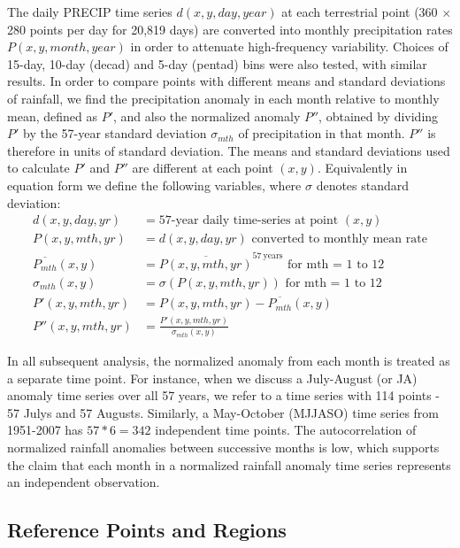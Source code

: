 The daily PRECIP time series $d(x,y,day,year)$ at each terrestrial point (360 $\times$ 280 points per day for 20,819 days) are converted into monthly precipitation rates $P(x,y,month,year)$ in order to attenuate high-frequency variability. Choices of 15-day, 10-day (decad) and 5-day (pentad) bins were also tested, with similar results. In order to compare points with different means and standard deviations of rainfall, we find the precipitation anomaly in each month relative to monthly mean, defined as $P'$, and also the normalized anomaly $P''$, obtained by dividing $P'$ by the 57-year standard deviation $\sigma_{mth}$ of precipitation in that month. $P''$ is therefore in units of standard deviation. The means and standard deviations used to calculate $P'$ and $P''$ are different at each point $(x,y)$. Equivalently in equation form we define the following variables, where $\sigma$ denotes standard deviation:
\begin{align*}  
	d(x,y,day,yr)& = \text{57-year daily time-series at point } (x,y) \\
	P(x,y,mth,yr) & =d(x,y,day,yr) \text{ converted to monthly mean rate} \\
	\overline{P_{mth}}(x,y) & = \overline{P(x,y,mth,yr)}^{\mathrm{57\ years}} \text{ for mth = 1 to 12}  \\
	\sigma_{mth}(x,y)& = \sigma(P(x,y,mth,yr)) \text{ for mth = 1 to 12} \\
	P'(x,y,mth,yr)& =P(x,y,mth,yr)-\overline{P_{mth}}(x,y) \\
	P''(x,y,mth,yr)& =\frac{P'(x,y,mth,yr)}{\sigma_{mth}(x,y)}
\end{align*}   
		
In all subsequent analysis, the normalized anomaly from each month is treated as a separate time point. For instance, when we discuss a July-August (or JA) anomaly time series over all 57 years, we refer to a time series with 114 points - 57 Julys and 57 Augusts. Similarly, a May-October (MJJASO) time series from 1951-2007 has $57*6=342$ independent time points. The autocorrelation of normalized rainfall anomalies between successive months is low, which supports the claim that each month in a normalized rainfall anomaly time series represents an independent observation.
		
\subsection{Reference Points and Regions}
	
